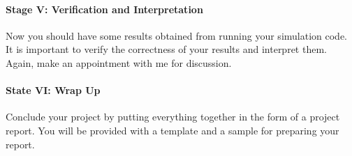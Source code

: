\documentclass[12pt]{article}%
\begin{document}
\paragraph{Stage V: Verification and Interpretation} %
Now you should have some results obtained from running your
simulation code. It is important to verify the correctness of your
results and interpret them. Again, make an appointment with me for
discussion.

\paragraph{State VI: Wrap Up}%
Conclude your project by putting everything together in the form of
a project report. You will be provided with a template and a sample
for preparing your report.

%
%
%
%
%
%
%

%
%



\end{document}
